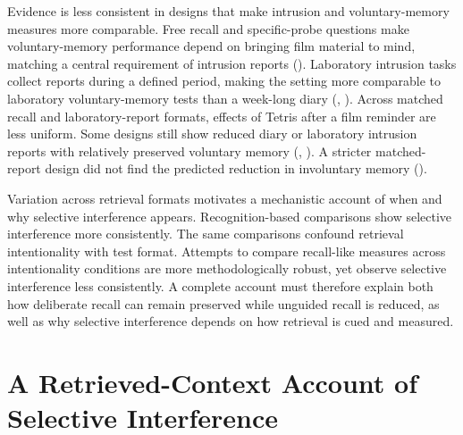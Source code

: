 \documentclass[
  man,
  floatsintext,
  longtable,
  nolmodern,
  notxfonts,
  notimes,
  draftfirst,
  colorlinks=true,linkcolor=blue,citecolor=blue,urlcolor=blue]{apa7}
\begin{document}
Evidence is less consistent in designs that make intrusion and
voluntary-memory measures more comparable. Free recall and
specific-probe questions make voluntary-memory performance depend on
bringing film material to mind, matching a central requirement of
intrusion reports (). Laboratory intrusion tasks collect reports during a defined
period, making the setting more comparable to laboratory
voluntary-memory tests than a week-long diary
(,
). Across matched recall and
laboratory-report formats, effects of Tetris after a film reminder are
less uniform. Some designs still show reduced diary or laboratory
intrusion reports with relatively preserved voluntary memory
(,
). A stricter matched-report
design did not find the predicted reduction in involuntary memory
().

Variation across retrieval formats motivates a mechanistic account of
when and why selective interference appears. Recognition-based
comparisons show selective interference more consistently. The same
comparisons confound retrieval intentionality with test format. Attempts
to compare recall-like measures across intentionality conditions are
more methodologically robust, yet observe selective interference less
consistently. A complete account must therefore explain both how
deliberate recall can remain preserved while unguided recall is reduced,
as well as why selective interference depends on how retrieval is cued
and measured.

\section{A Retrieved-Context Account of Selective
Interference}\label{a-retrieved-context-account-of-selective-interference}

\newpage{}
\end{document}
